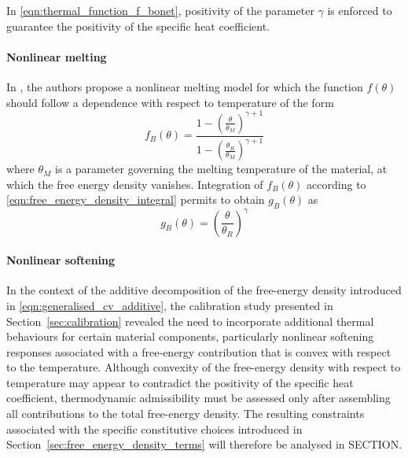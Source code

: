In \eqref{eqn:thermal_function_f_bonet}, positivity of the parameter $\gamma$ is enforced to guarantee the positivity of the specific heat coefficient.


\paragraph{Nonlinear melting}
In \cite{BonetGil2026}, the authors propose a nonlinear melting model for which the function $f(\theta)$ should follow a dependence with respect to temperature of the form
%
\begin{equation} \label{eqn:thermal_function_f_melting}
  f_B(\theta) = \frac{1 - \left(\frac{\theta}{\theta_M}\right)^{\gamma+1}}
                     {1 - \left(\frac{\theta_R}{\theta_M}\right)^{\gamma+1}}
\end{equation}
where $\theta_M$ is a parameter governing the melting temperature of the material, at which the free energy density vanishes. Integration of $f_B(\theta)$ according to \eqref{eqn:free_energy_density_integral} permits to obtain $g_B(\theta)$ as
%
\begin{equation}\label{eqn:thermal_function_g_melting}
g_B(\theta) = \left(\frac{\theta}{\theta_R}\right)^\gamma
\end{equation}


\paragraph{Nonlinear softening}


In the context of the additive decomposition of the free-energy density
introduced in \eqref{eqn:generalised_cv_additive}, the calibration study
presented in Section~\ref{sec:calibration} revealed the need to
incorporate additional thermal behaviours for certain material
components, particularly nonlinear softening responses associated with a
free-energy contribution that is convex with respect to the
temperature. Although convexity of the free-energy density with respect
to temperature may appear to contradict the positivity of the specific
heat coefficient, thermodynamic admissibility must be assessed only
after assembling all contributions to the total free-energy density. The
resulting constraints associated with the specific constitutive choices
introduced in Section~\ref{sec:free_energy_density_terms} will therefore
be analysed in SECTION.

